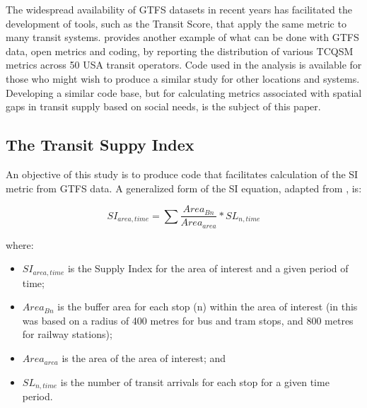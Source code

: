 \documentclass[preprint, 3p,
authoryear]{elsarticle} %
\begin{document}
The widespread availability of GTFS datasets in recent years has
facilitated the development of tools, such as the Transit Score, that
apply the same metric to many transit systems. \citet{Wong:2013aa}
provides another example of what can be done with GTFS data, open
metrics and coding, by reporting the distribution of various TCQSM
metrics across 50 USA transit operators. Code used in the
\citet{Wong:2013aa} analysis is available for those who might wish to
produce a similar study for other locations and systems. Developing a
similar code base, but for calculating metrics associated with spatial
gaps in transit supply based on social needs, is the subject of this
paper.

\hypertarget{the-transit-suppy-index}{%
\subsection{The Transit Suppy Index}\label{the-transit-suppy-index}}

An objective of this study is to produce code that facilitates
calculation of the SI metric from GTFS data. A generalized form of the
SI equation, adapted from \citet{currie2010identifying}, is:

\[SI_{area, time} = \sum{\frac{Area_{Bn}}{Area_{area}}*SL_{n, time}}\]

where:

\begin{itemize}
\item
  \(SI_{area, time}\) is the Supply Index for the area of interest and a
  given period of time;
\item
  \(Area_{Bn}\) is the buffer area for each stop (n) within the area of
  interest (in \citet{currie2010identifying} this was based on a radius
  of 400 metres for bus and tram stops, and 800 metres for railway
  stations);
\item
  \(Area_{area}\) is the area of the area of interest; and
\item
  \(SL_{n,time}\) is the number of transit arrivals for each stop for a
  given time period.
\end{itemize}
\end{document}
